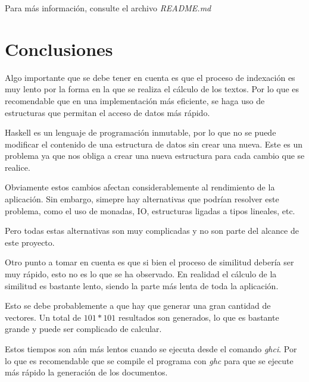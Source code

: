 \documentclass{nrfh-ish}
\begin{document}
Para más información, consulte el archivo \textit{README.md}

\section{Conclusiones}
Algo importante que se debe tener en cuenta es que el proceso
de indexación es muy lento por la forma en la que se realiza
el cálculo de los textos. Por lo que es recomendable que
en una implementación más eficiente, se haga uso de estructuras
que permitan el acceso de datos más rápido.

Haskell es un lenguaje de programación inmutable, por lo que
no se puede modificar el contenido de una estructura de datos
sin crear una nueva. Este es un problema ya que nos obliga a
crear una nueva estructura para cada cambio que se realice.

Obviamente estos cambios afectan considerablemente al rendimiento
de la aplicación. Sin embargo, simepre hay alternativas que
podrían resolver este problema, como el uso de monadas, IO,
estructuras ligadas a tipos lineales, etc.

Pero todas estas alternativas son muy complicadas y no son
parte del alcance de este proyecto.

Otro punto a tomar en cuenta es que si bien el proceso de
similitud debería ser muy rápido, esto no es lo que se ha
observado. En realidad el cálculo de la similitud es bastante
lento, siendo la parte más lenta de toda la aplicación.

Esto se debe probablemente a que hay que generar una gran
cantidad de vectores. Un total de $101*101$ resultados
son generados, lo que es bastante grande y puede ser
complicado de calcular.

Estos tiempos son aún más lentos cuando se ejecuta desde el
comando \textit{ghci}. Por lo que es recomendable que se
compile el programa con \textit{ghc} para que se ejecute
más rápido la generación de los documentos.
\end{document}
